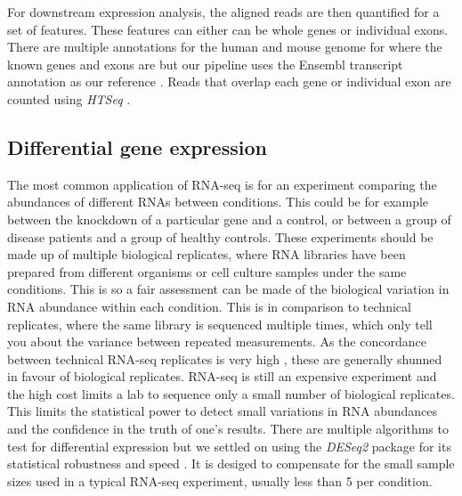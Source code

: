 For downstream expression analysis, the aligned reads are then quantified for a set of features. These features can either can be whole genes or individual exons. 
There are multiple annotations for the human and mouse genome for where the known genes and exons are but our pipeline uses the Ensembl transcript annotation as our reference \citep{Cunningham2015}. 
Reads that overlap each gene or individual exon are counted using \textit{HTSeq} \citep{Anders2015-wz}.

\subsection{Differential gene expression}

The most common application of RNA-seq is for an experiment comparing the abundances of different RNAs between conditions.
This could be for example between the knockdown of a particular gene and a control, or between a group of disease patients and a group of healthy controls. 
These experiments should be made up of multiple biological replicates, where RNA libraries have been prepared from different organisms or cell culture samples under the same conditions. 
This is so a fair assessment can be made of the biological variation in RNA abundance within each condition. 
This is in comparison to technical replicates, where the same library is sequenced multiple times, which only tell you about the variance between repeated measurements.
As the concordance between technical RNA-seq replicates is very high \citep{Mortazavi2008}, these are generally shunned in favour of biological replicates. 
RNA-seq is still an expensive experiment and the high cost limits a lab to sequence only a small number of biological replicates.
This limits the statistical power to detect small variations in RNA abundances and the confidence in the truth of one's results. 
There are multiple algorithms to test for differential expression but we settled on using the \textit{DESeq2} package for its statistical robustness and speed \citep{Love2014}. 
It is desiged to compensate for the small sample sizes used in a typical RNA-seq experiment, usually less than 5 per condition.

